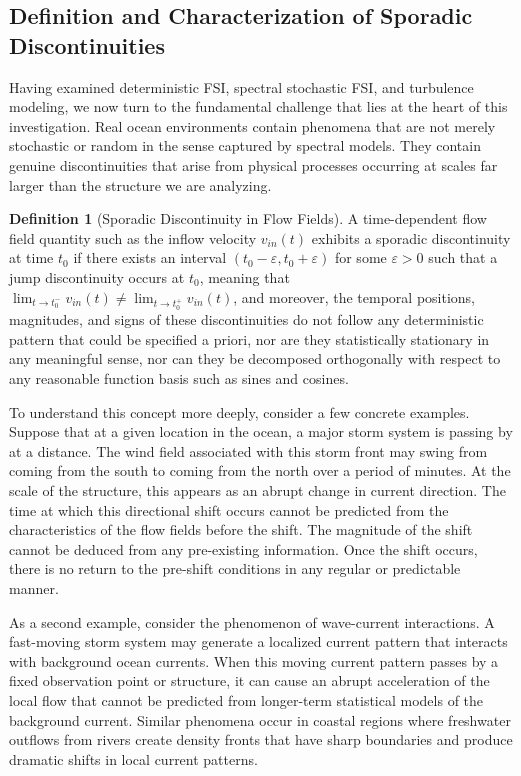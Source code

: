 ﻿\documentclass[a4paper,11pt]{article}
\theoremstyle{definition}
\newtheorem{definition}{Definition}
\begin{document}
\subsection{Definition and Characterization of Sporadic Discontinuities}

Having examined deterministic FSI, spectral stochastic FSI, and turbulence modeling, we now turn to the fundamental challenge that lies at the heart of this investigation. Real ocean environments contain phenomena that are not merely stochastic or random in the sense captured by spectral models. They contain genuine discontinuities that arise from physical processes occurring at scales far larger than the structure we are analyzing.

\begin{definition}[Sporadic Discontinuity in Flow Fields]
A time-dependent flow field quantity such as the inflow velocity $v_{in}(t)$ exhibits a sporadic discontinuity at time $t_0$ if there exists an interval $(t_0 - \varepsilon, t_0 + \varepsilon)$ for some $\varepsilon > 0$ such that a jump discontinuity occurs at $t_0$, meaning that $\lim_{t \to t_0^-} v_{in}(t) \neq \lim_{t \to t_0^+} v_{in}(t)$, and moreover, the temporal positions, magnitudes, and signs of these discontinuities do not follow any deterministic pattern that could be specified a priori, nor are they statistically stationary in any meaningful sense, nor can they be decomposed orthogonally with respect to any reasonable function basis such as sines and cosines.
\end{definition}

To understand this concept more deeply, consider a few concrete examples. Suppose that at a given location in the ocean, a major storm system is passing by at a distance. The wind field associated with this storm front may swing from coming from the south to coming from the north over a period of minutes. At the scale of the structure, this appears as an abrupt change in current direction. The time at which this directional shift occurs cannot be predicted from the characteristics of the flow fields before the shift. The magnitude of the shift cannot be deduced from any pre-existing information. Once the shift occurs, there is no return to the pre-shift conditions in any regular or predictable manner.

As a second example, consider the phenomenon of wave-current interactions. A fast-moving storm system may generate a localized current pattern that interacts with background ocean currents. When this moving current pattern passes by a fixed observation point or structure, it can cause an abrupt acceleration of the local flow that cannot be predicted from longer-term statistical models of the background current. Similar phenomena occur in coastal regions where freshwater outflows from rivers create density fronts that have sharp boundaries and produce dramatic shifts in local current patterns.
\end{document}
